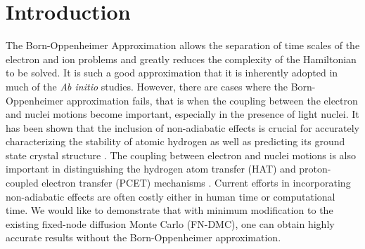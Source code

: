 \documentclass[aps,prl,superscriptaddress,groupedaddress]{revtex4}
\begin{document}


\maketitle

\section{Introduction}
The Born-Oppenheimer Approximation\cite{BO} allows the separation of time scales of the electron and ion problems and greatly reduces the complexity of the Hamiltonian to be solved. It is such a good approximation that it is inherently adopted in much of the \textit{Ab initio} studies. However, there are cases where the Born-Oppenheimer approximation fails, that is when the coupling between the electron and nuclei motions become important, especially in the presence of light nuclei. It has been shown that the inclusion of non-adiabatic effects is crucial for accurately characterizing the stability of atomic hydrogen as well as predicting its ground state crystal structure \cite{Ceperley_1987,Natoli_1993,Natoli_1995}. The coupling between electron and nuclei motions is also important in distinguishing the hydrogen atom transfer (HAT) and proton-coupled electron transfer (PCET) mechanisms \cite{Sirjoosingh_PCET}. Current efforts in incorporating  non-adiabatic effects are often costly either in human time or computational time. We would like to demonstrate that with minimum modification to the existing fixed-node diffusion Monte Carlo (FN-DMC), one can obtain highly accurate results without the Born-Oppenheimer approximation.
\end{document}
